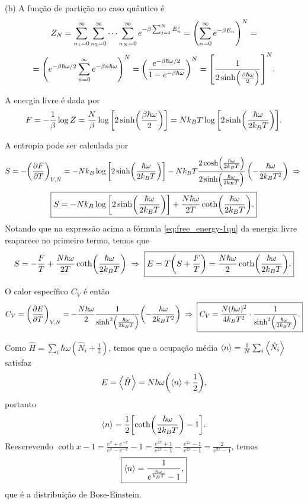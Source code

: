 \documentclass[a4paper,10pt]{article}
\begin{document}
(b) A função de partição no caso quântico é
$$
Z_N = \sum_{n_1 = 0}^{\infty} \sum_{n_2 = 0}^{\infty} \cdots \sum_{n_N = 0}^{\infty} e^{-\beta \sum_{j=1}^{N} E_n^j} =
\qty(\sum_{n=0}^{\infty} e^{-\beta E_n})^N =
$$
$$
= \qty(e^{-\beta \hbar \omega / 2} \sum_{n=0}^{\infty} e^{-\beta n \hbar\omega})^N =
\qty(\frac{e^{-\beta \hbar \omega / 2}}{1 - e^{-\beta\hbar\omega}})^N =
\qty[\frac{1}{2\sinh(\frac{\beta\hbar\omega}{2})}]^N.
$$

A energia livre é dada por
\begin{equation} \label{eq:free_energy-1qu}
F = - \frac{1}{\beta} \log Z = \frac{N}{\beta} \log\qty[2 \sinh(\frac{\beta\hbar\omega}{2})] =
N k_B T \log\qty[2 \sinh(\frac{\hbar\omega}{2 k_B T})].
\end{equation}

A entropia pode ser calculada por
$$
S = -\qty(\pdv{F}{T})_{V,N} = - N k_B \log\qty[2 \sinh(\frac{\hbar\omega}{2 k_B T})] -
N k_B T \frac{2 \cosh(\frac{\hbar\omega}{2 k_B T})}{2 \sinh(\frac{\hbar\omega}{2 k_B T})} \,
\qty(-\frac{\hbar\omega}{2 k_B T^2}) \; \Rightarrow \;
$$
$$
\boxed{
S = - N k_B \log\qty[2 \sinh(\frac{\hbar\omega}{2 k_B T})] + \frac{N\hbar\omega}{2 T} \coth(\frac{\hbar\omega}{2 k_B T}).
}
$$
Notando que na expressão acima a fórmula \ref{eq:free_energy-1qu} da energia livre reaparece no primeiro termo, temos que
$$
S = - \frac{F}{T} + \frac{N\hbar\omega}{2 T} \coth(\frac{\hbar\omega}{2 k_B T}) \; \Rightarrow \;
\boxed{ E = T \qty(S + \frac{F}{T}) = \frac{N\hbar\omega}{2} \coth(\frac{\hbar\omega}{2 k_B T}). }
$$

O calor específico $C_V$ é então
$$
C_V = \qty(\pdv{E}{T})_{V,N} =
- \frac{N\hbar\omega}{2} \frac{1}{\sinh[2](\frac{\hbar\omega}{2 k_B T})} \qty(-\frac{\hbar\omega}{2 k_B T^2}) \; \Rightarrow \;
\boxed{
C_V =
\frac{N (\hbar\omega)^2}{4 k_B T^2} \cdot \frac{1}{\sinh[2](\frac{\hbar\omega}{2 k_B T})}.
}
$$

\n

Como $\hat{H} = \sum_{i} \hbar\omega(\hat{N}_i + \frac{1}{2})$, temos que a ocupação média $\ev{n} = \frac{1}{N} \sum_{i} \ev{\hat{N}_i}$ satisfaz
$$
E = \ev{\hat{H}} = N \hbar\omega\qty(\ev{n} + \frac{1}{2}),
$$
portanto
$$
\ev{n} = \frac{1}{2} \qty[\coth(\frac{\hbar\omega}{2 k_B T}) - 1].
$$
Reescrevendo $\coth x - 1 = \frac{e^x + e^{-x}}{e^x - e^{-x}} - 1 = \frac{e^{2x} + 1}{e^{2x} - 1} - \frac{e^{2x} - 1}{e^{2x} - 1} = \frac{2}{e^{2x} - 1}$, temos
$$
\boxed{ \ev{n} = \frac{1}{e^{\frac{\hbar\omega}{k_B T}} - 1}, }
$$
que é a distribuição de Bose-Einstein.

\n
\end{document}
